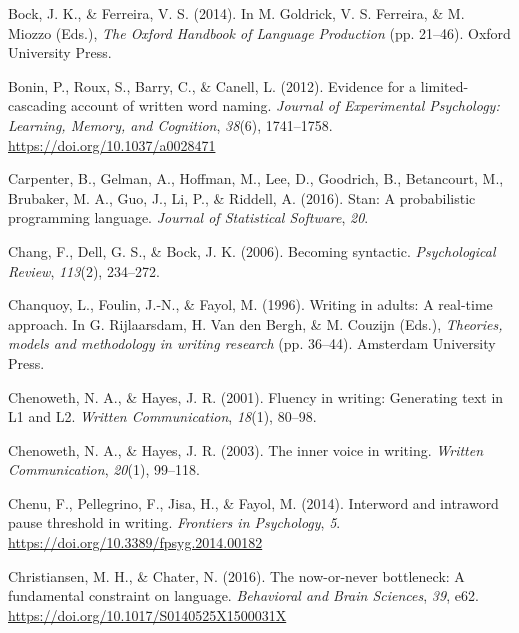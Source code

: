 \documentclass[
  man,floatsintext]{apa7}
\newlength{\cslhangindent}
\newlength{\cslentryspacingunit} %
\newenvironment{CSLReferences}[2] %
 {%
  \setlength{\parindent}{0pt}
  \ifodd #1
  \let\oldpar\par
  \def\par{\hangindent=\cslhangindent\oldpar}
  \fi
  \setlength{\parskip}{#2\cslentryspacingunit}
 }%
 {}
\begin{document}
\begin{CSLReferences}{1}{0}
\leavevmode{}%
Bock, J. K., \& Ferreira, V. S. (2014). In M. Goldrick, V. S. Ferreira, \& M. Miozzo (Eds.), \emph{{The Oxford Handbook of Language Production}} (pp. 21--46). Oxford University Press.

\leavevmode{}%
Bonin, P., Roux, S., Barry, C., \& Canell, L. (2012). Evidence for a limited-cascading account of written word naming. \emph{Journal of Experimental Psychology: Learning, Memory, and Cognition}, \emph{38}(6), 1741--1758. \url{https://doi.org/10.1037/a0028471}

\leavevmode{}%
Carpenter, B., Gelman, A., Hoffman, M., Lee, D., Goodrich, B., Betancourt, M., Brubaker, M. A., Guo, J., Li, P., \& Riddell, A. (2016). Stan: A probabilistic programming language. \emph{Journal of Statistical Software}, \emph{20}.

\leavevmode{}%
Chang, F., Dell, G. S., \& Bock, J. K. (2006). Becoming syntactic. \emph{Psychological Review}, \emph{113}(2), 234--272.

\leavevmode{}%
Chanquoy, L., Foulin, J.-N., \& Fayol, M. (1996). Writing in adults: {A} real-time approach. In G. Rijlaarsdam, H. Van den Bergh, \& M. Couzijn (Eds.), \emph{Theories, models and methodology in writing research} (pp. 36--44). Amsterdam University Press.

\leavevmode{}%
Chenoweth, N. A., \& Hayes, J. R. (2001). Fluency in writing: Generating text in {L1} and {L2}. \emph{Written Communication}, \emph{18}(1), 80--98.

\leavevmode{}%
Chenoweth, N. A., \& Hayes, J. R. (2003). The inner voice in writing. \emph{Written Communication}, \emph{20}(1), 99--118.

\leavevmode{}%
Chenu, F., Pellegrino, F., Jisa, H., \& Fayol, M. (2014). Interword and intraword pause threshold in writing. \emph{Frontiers in Psychology}, \emph{5}. \url{https://doi.org/10.3389/fpsyg.2014.00182}

\leavevmode{}%
Christiansen, M. H., \& Chater, N. (2016). The now-or-never bottleneck: A fundamental constraint on language. \emph{Behavioral and Brain Sciences}, \emph{39}, e62. \url{https://doi.org/10.1017/S0140525X1500031X}


\end{CSLReferences}
\end{document}

